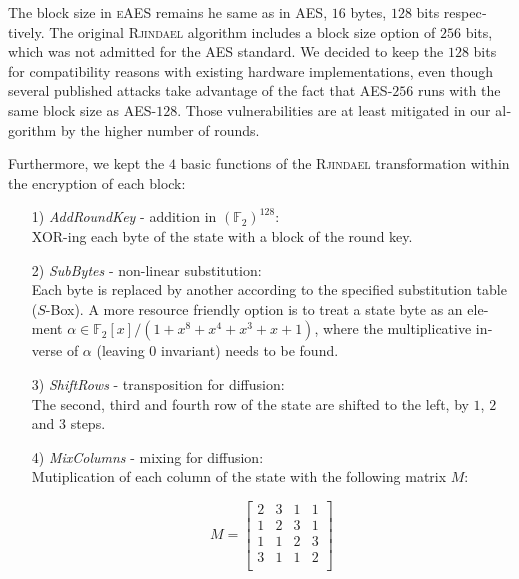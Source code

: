 \documentclass[a4paper,11pt]{article}
\begin{document}
\begin{otherlanguage}{english}
\begin{multicols}{2}
\noindent
The block size in \textsc{eAES} remains he same as in \textsc{AES}, $16$ bytes, $128$ bits respectively. The original \textsc{Rjindael} algorithm includes a block size option of $256$ bits, which was not admitted for the \textsc{AES} standard. We decided to keep the $128$ bits for compatibility reasons with existing hardware implementations, even though several published attacks take advantage of the fact that \textsc{AES}-$256$ runs with the same block size as \textsc{AES}-$128$. Those vulnerabilities are at least mitigated in our algorithm by the higher number of rounds. \\ 


\noindent
Furthermore, we kept the $4$ basic functions of the \textsc{Rjindael} transformation within the encryption of each block: 

\vspace{0.2cm}
\begin{itemize} [noitemsep, nolistsep]
  \item[1)] \textit{AddRoundKey} - addition in ${(\mathbb{F}_2)}^{128}$: \\ 
  XOR-ing each byte of the state with a block of the round key.
  \vspace{0.1cm}

  \item[2)] \textit{SubBytes} - non-linear substitution: \\
  Each byte is replaced by another according to the specified substitution table ($S$-Box). A more resource friendly option is to treat a state byte as an element $\alpha \in \mathbb{F}_2 [x]/(1 + x^8 + x^4 + x^3 + x + 1)$, where the multiplicative inverse of $\alpha$ (leaving 0 invariant) needs to be found.
  \vspace{0.1cm}

  \item[3)] \textit{ShiftRows} - transposition for diffusion: \\
  The second, third and fourth row of the state are shifted to the left, by $1$, $2$ and $3$ steps.
  \vspace{0.1cm}

  \item[4)] \textit{MixColumns} - mixing for diffusion: \\
  Mutiplication of each column of the state with the following matrix $M$:

  $$ 
  	M = 
  	\begin{bmatrix}
  		2 & 3 & 1 & 1 \\ 
  	 	1 & 2 & 3 & 1 \\
  	 	1 & 1 & 2 & 3 \\
  	 	3 & 1 & 1 & 2 \\
  	\end{bmatrix}
  $$


\end{itemize}
\end{multicols}
\end{otherlanguage}
\end{document}
